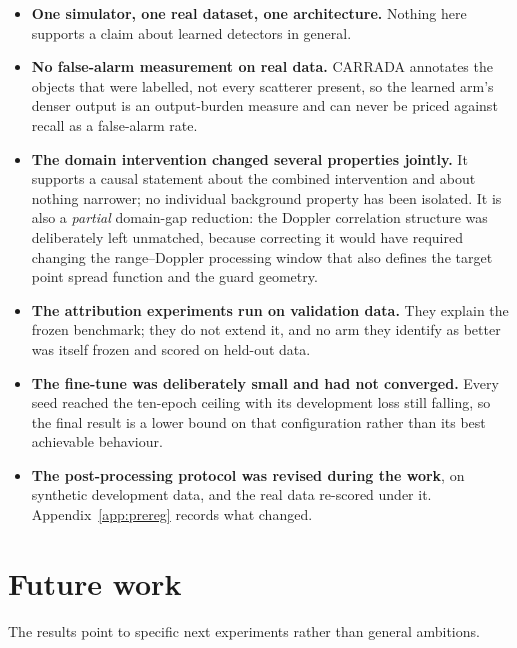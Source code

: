 \begin{itemize}
\itemsep2pt
\item \textbf{One simulator, one real dataset, one architecture.} Nothing here supports a claim about
learned detectors in general.
\item \textbf{No false-alarm measurement on real data.} CARRADA annotates the objects that were
labelled, not every scatterer present, so the learned arm's denser output is an output-burden measure
and can never be priced against recall as a false-alarm rate.
\item \textbf{The domain intervention changed several properties jointly.} It supports a causal
statement about the combined intervention and about nothing narrower; no individual background
property has been isolated. It is also a \emph{partial} domain-gap reduction: the Doppler correlation
structure was deliberately left unmatched, because correcting it would have required changing the
range--Doppler processing window that also defines the target point spread function and the guard
geometry.
\item \textbf{The attribution experiments run on validation data.} They explain the frozen benchmark;
they do not extend it, and no arm they identify as better was itself frozen and scored on held-out
data.
\item \textbf{The fine-tune was deliberately small and had not converged.} Every seed reached the
ten-epoch ceiling with its development loss still falling, so the final result is a lower bound on
that configuration rather than its best achievable behaviour.
\item \textbf{The post-processing protocol was revised during the work}, on synthetic development
data, and the real data re-scored under it. Appendix~\ref{app:prereg} records what changed.
\end{itemize}

\section*{Future work}

The results point to specific next experiments rather than general ambitions.

